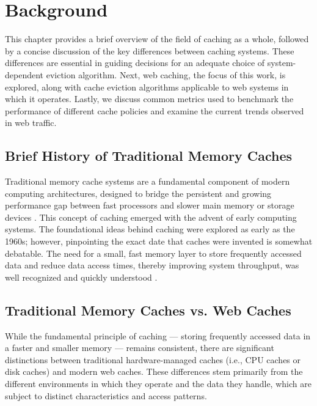 \chapter{Background}\label{chapter:background}

This chapter provides a brief overview of the field of caching as a whole, followed by a concise discussion of the key differences between caching systems. These differences are essential in guiding decisions for an adequate choice of system-dependent eviction algorithm. Next, web caching, the focus of this work, is explored, along with cache eviction algorithms applicable to web systems in which it operates. Lastly, we discuss common metrics used to benchmark the performance of different cache policies and examine the current trends observed in web traffic.

\section{Brief History of Traditional Memory Caches}

Traditional memory cache systems are a fundamental component of modern computing architectures, designed to bridge the persistent and growing performance gap between fast processors and slower main memory or storage devices \cite{belady-ibm-1966}. This concept of caching emerged with the advent of early computing systems. The foundational ideas behind caching were explored as early as the 1960s; however, pinpointing the exact date that caches were invented is somewhat debatable. The need for a small, fast memory layer to store frequently accessed data and reduce data access times, thereby improving system throughput, was well recognized and quickly understood \cite{belady-ibm-1966}.


\section{Traditional Memory Caches vs. Web Caches}


While the fundamental principle of caching — storing frequently accessed data in a faster and smaller memory — remains consistent, there are significant distinctions between traditional hardware-managed caches (i.e., CPU caches or disk caches) and modern web caches. These differences stem primarily from the different environments in which they operate and the data they handle, which are subject to distinct characteristics and access patterns.

